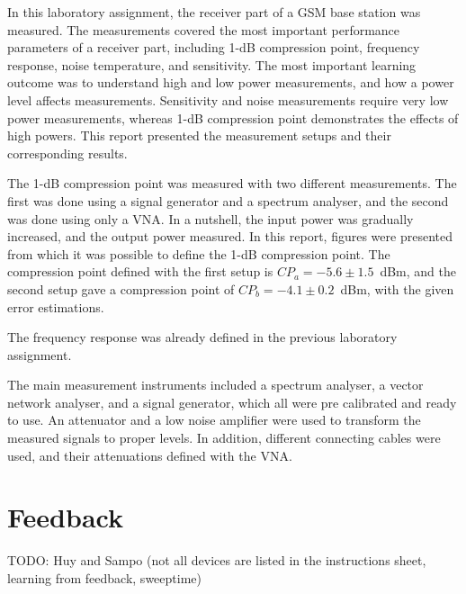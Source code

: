 \documentclass[a4paper, 12pt]{article}
\begin{document}
In this laboratory assignment, the receiver part of a GSM base station was measured. The measurements covered the most important performance parameters of a receiver part, including 1-dB compression point, frequency response, noise temperature, and sensitivity. The most important learning outcome was to understand high and low power measurements, and how a power level affects measurements. Sensitivity and noise measurements require very low power measurements, whereas 1-dB compression point demonstrates the effects of high powers. This report presented the measurement setups and their corresponding results.

The 1-dB compression point was measured with two different measurements. The first was done using a signal generator and a spectrum analyser, and the second was done using only a VNA. In a nutshell, the input power was gradually increased, and the output power measured. In this report, figures were presented from which it was possible to define the 1-dB compression point. The compression point defined with the first setup is $CP_a = -5.6 \pm 1.5$~dBm, and the second setup gave a compression point of $CP_b = -4.1 \pm 0.2$~dBm, with the given error estimations.

The frequency response was already defined in the previous laboratory assignment. 

The main measurement instruments included a spectrum analyser, a vector network analyser, and a signal generator, which all were pre calibrated and ready to use. An attenuator and a low noise amplifier were used to transform the measured signals to proper levels. In addition, different connecting cables were used, and their attenuations defined with the VNA.




\newpage
\section{Feedback}

TODO: Huy and Sampo (not all devices are listed in the instructions sheet, learning from feedback, sweeptime)
\end{document}
